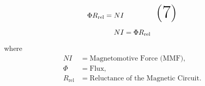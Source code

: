 \documentclass{article}
\begin{document}
\vspace{0.5cm} %
\begin{equation}
   \Huge  {\Phi}R_\text{rel}= NI \tag{7}
\end{equation}\vspace{0.5cm} %

\begin{tcolorbox}[colframe=red, boxrule=1mm, sharp corners=south] %
\[
   \Huge NI= {\Phi}R_\text{rel}
\]
\end{tcolorbox}

\noindent
where 
\begin{align*}
NI &= \text{Magnetomotive Force (MMF)}, \\
\Phi &= \text{Flux}, \\
R_\text{rel} &= \text{Reluctance of the Magnetic Circuit}.
\end{align*}
\end{document}
